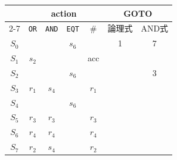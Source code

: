 \documentclass{jarticle}
\begin{document}
\begin{tabular}{|c|c|c|c|c|c|c|}\hline
      & \multicolumn{4}{|c}{action} & \multicolumn{2}{|c|}{GOTO}\\\cline{2-7}
      & \texttt{OR} & \texttt{AND} & \texttt{EQT} & $\#$ & 論理式 & AND式\\\hline
$S_0$ &             &              & $s_6$ & & 1      &  7   \\
$S_1$ & $s_2$ &        &              & acc  &        &      \\
$S_2$ &             &              & $s_6$ & &        &  3   \\
$S_3$ & $r_1$ & $s_4$ &      & $r_1$ & &   \\
$S_4$ &             &              & $s_6$ & &        &      \\
$S_5$ & $r_3$ & $r_3$ & & $r_3$ &      &      \\
$S_6$ & $r_4$ & $r_4$ & & $r_4$ &      &      \\
$S_7$ & $r_2$ & $s_4$ &  & $r_2$ &      &      \\\hline
\end{tabular}
\end{document}
